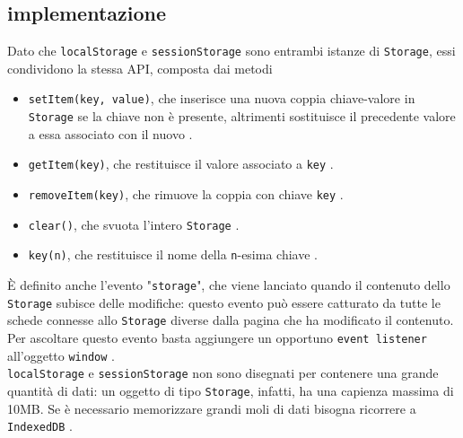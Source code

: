 \documentclass[a4paper, 12pt, twoside, openright]{book}
\begin{document}
\subsection{implementazione}
Dato che \texttt{localStorage} e \texttt{sessionStorage} sono entrambi istanze di \texttt{Storage}, essi condividono la stessa API, composta dai metodi
\begin{itemize}
\item\texttt{setItem(key, value)}, che inserisce una nuova coppia chiave-valore in \texttt{Storage} se la chiave non è presente, altrimenti sostituisce il precedente valore a essa associato con il nuovo \cite{MDN_Web_docs:localStorage}.
\item\texttt{getItem(key)}, che restituisce il valore associato a \texttt{key} \cite{MDN_Web_docs:localStorage}.
\item\texttt{removeItem(key)}, che rimuove la coppia con chiave \texttt{key} \cite{MDN_Web_docs:localStorage}.
\item\texttt{clear()}, che svuota l'intero \texttt{Storage} \cite{MDN_Web_docs:localStorage}.
\item\texttt{key(n)}, che restituisce il nome della \texttt{n}-esima chiave \cite{MDN_Web_docs:localStorage}. 
\end{itemize}
È definito anche l'evento "\texttt{storage}", che viene lanciato quando il contenuto dello \texttt{Storage} subisce delle modifiche: questo evento può essere catturato da tutte le schede connesse allo \texttt{Storage} diverse dalla pagina che ha modificato il contenuto. Per ascoltare questo evento basta aggiungere un opportuno \texttt{event listener} all'oggetto \texttt{window} \cite{MDN_Web_docs:storage_API}.\\
\texttt{localStorage} e \texttt{sessionStorage} non sono disegnati per contenere una grande quantità di dati: un oggetto di tipo \texttt{Storage}, infatti, ha una capienza massima di 10MB. Se è necessario memorizzare grandi moli di dati bisogna ricorrere a \texttt{IndexedDB} \cite{MDN_Web_docs:IndexedDB_basic}.
\end{document}
